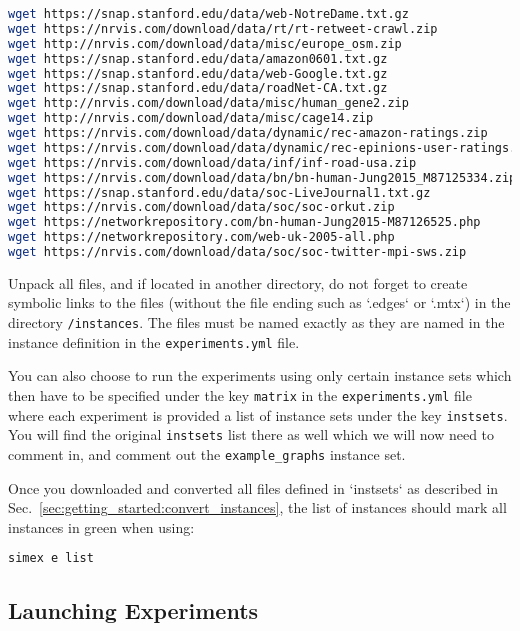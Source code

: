 \documentclass[11pt, a4paper]{scrartcl}
\newcommand{\expfile}{\texttt{experiments.yml} file\xspace}
\begin{document}
\begin{lstlisting}[language=bash]
wget https://snap.stanford.edu/data/web-NotreDame.txt.gz
wget https://nrvis.com/download/data/rt/rt-retweet-crawl.zip
wget http://nrvis.com/download/data/misc/europe_osm.zip
wget https://snap.stanford.edu/data/amazon0601.txt.gz
wget https://snap.stanford.edu/data/web-Google.txt.gz
wget https://snap.stanford.edu/data/roadNet-CA.txt.gz
wget http://nrvis.com/download/data/misc/human_gene2.zip
wget http://nrvis.com/download/data/misc/cage14.zip
wget https://nrvis.com/download/data/dynamic/rec-amazon-ratings.zip
wget https://nrvis.com/download/data/dynamic/rec-epinions-user-ratings.zip
wget https://nrvis.com/download/data/inf/inf-road-usa.zip
wget https://nrvis.com/download/data/bn/bn-human-Jung2015_M87125334.zip
wget https://snap.stanford.edu/data/soc-LiveJournal1.txt.gz
wget https://nrvis.com/download/data/soc/soc-orkut.zip
wget https://networkrepository.com/bn-human-Jung2015-M87126525.php
wget https://networkrepository.com/web-uk-2005-all.php
wget https://nrvis.com/download/data/soc/soc-twitter-mpi-sws.zip
\end{lstlisting}

Unpack all files, and if located in another directory,  do not forget to create
symbolic links to the files (without the file ending such as `.edges` or `.mtx`)
in the directory \texttt{/instances}. The files must be named exactly as they
are named in the instance definition in the \expfile.

You can also choose to run the experiments using only certain instance sets
which then have to be specified under the key \texttt{matrix} in the \expfile
where each experiment is provided a list of instance sets under the key
\texttt{instsets}. You will find the original \texttt{instsets} list there as
well which we will now need to comment in, and comment out the
\texttt{example\_graphs} instance set.

Once you downloaded and converted all files defined in `instsets` as described
in Sec.~\ref{sec:getting_started:convert_instances}, the list of instances
should mark all instances in green when using:

\begin{lstlisting}[language=bash]
simex e list
\end{lstlisting}

\subsection{Launching Experiments}
\end{document}
